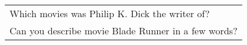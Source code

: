 \begin{table}[t]
\begin{small}
\begin{center}
{{\begin{tabular}{|L|}
\textcolor{dgreen}{Which movies was Philip K. Dick the writer of?}\\
\textcolor{dgreen}{Can you describe movie Blade Runner in a few words?}
\\



\end{tabular}}}
\end{center}
\end{small}
\end{table}
